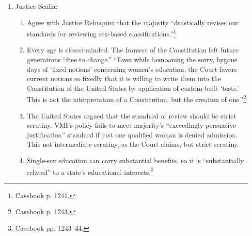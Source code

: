 \begin{enumerate}
    \begin{enumerate}
        \item Justice Ginsburg's ``exceedingly persuasive justification'' 
        standard ``introduces an element of uncertainty respecting the 
        appropriate test'' for evaluating whether gender classifications 
        violate equal protection.\footnote{Casebook p. 1239.}
        \item VMI's policies were not constitutionally suspect until 
        \emph{Mississippi Univ. for Women v. Hogan} 11 years ago. The Court 
        should not consider evidence prior to \emph{Hogan}.
        \item ``~.~.~.~it is not the `exclusion of women' that violates the 
        Equal Protection Clause, but the maintenance of an all-men's school 
        without providing any---much less a comparable---institution for 
        women.''\footnote{Casebook p. 1241.}
    \end{enumerate}
    \item Justice Scalia:
    \begin{enumerate}
        \item Agree with Justice Rehnquist that the majority ``drastically 
        revises our standards for reviewing sex-based 
        classifications.''\footnote{Casebook p. 1241.}
        \item Every age is closed-minded. The framers of the Constitution left 
        future generations ``free to change.'' ``Even while bemoaning the 
        sorry, bygone days of `fixed notions' concerning women's education, 
        the Court favors current notions so fixedly that it is willing to 
        write them into the Constitution of the United States by application 
        of custom-built `tests.' This is not the interpretation of a 
        Constitution, but the creation of one.''\footnote{Casebook p. 1243.}
        \item The United States argued that the standard of review should be 
        strict scrutiny. VMI's policy fails to meet majority's ``exceedingly 
        persuasive justification'' standard if just one qualified woman is 
        denied admission. This not intermediate scrutiny, as the Court claims, 
        but strict scrutiny.
        \item Single-sex education can carry substantial benefits, so it is 
        ``substantially related'' to a state's educational 
        interests.\footnote{Casebook pp. 1243--44.}
    \end{enumerate}
\end{enumerate}

